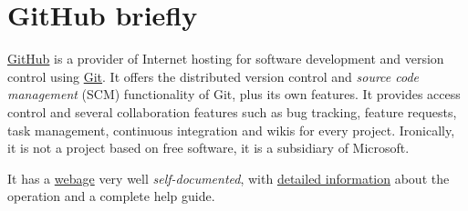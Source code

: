 \section{\textsf{GitHub} briefly}

\href{https://github.com/}{\textsf{GitHub}} is a provider of Internet hosting for software development and version control using \href{https://git-scm.com/}{Git}. It offers the distributed version control and \textit{source code management} (SCM) functionality of Git, plus its own features. It provides access control and several collaboration features such as bug tracking, feature requests, task management, continuous integration and wikis for every project. Ironically, it is not a project based on free software, it is a subsidiary of Microsoft.

It has a \href{https://docs.github.com/en}{webage} very well \textit{self-documented}, with \href{https://docs.github.com/en/github}{detailed information} about the operation and a complete help guide.


